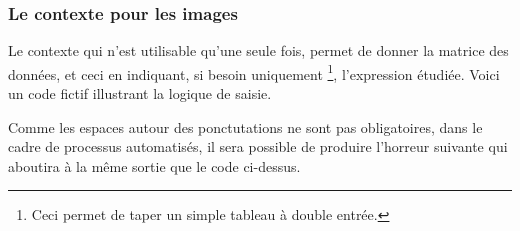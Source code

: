 \documentclass[10pt, a4paper]{article}
\begin{document}

\subsubsection{Le contexte  pour les images}

Le contexte  qui n'est utilisable qu'une seule fois, permet de donner la matrice des données, et ceci en indiquant, si besoin uniquement
\footnote{
	Ceci permet de taper un simple tableau à double entrée.
},
l'expression étudiée.
Voici un code fictif illustrant la logique de saisie.




Comme les espaces autour des ponctutations ne sont pas obligatoires, dans le cadre de processus automatisés, il sera possible de produire l'horreur suivante qui aboutira à la même sortie que le code ci-dessus.

\end{document}
